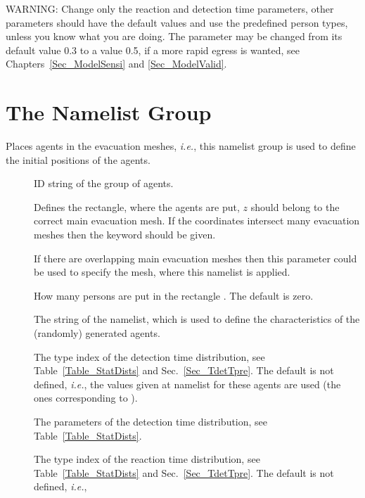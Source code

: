 \documentclass[12pt,a4paper,final,twoside]{stylevk}
\begin{document}
\noindent WARNING: Change only the reaction and detection time
parameters, other parameters should have the default values and use
the predefined person types, unless you know what you are doing.  The
parameter  may be changed from its default value 0.3
to a value 0.5, if a more rapid egress is wanted, see
Chapters~\ref{Sec_ModelSensi} and \ref{Sec_ModelValid}.

 
\section{The  Namelist Group}\label{Sec_EvacNML}

\noindent Places agents in the evacuation meshes, \emph{i.e.}, this
namelist group is used to define the initial positions of the agents.
%
\begin{description}
%
\item[] ID string of the group of agents.
%
\item[] Defines the rectangle, where the agents are put, $z$
  should belong to the correct main evacuation mesh.  If the
  coordinates  intersect many evacuation meshes then the
  keyword  should be given.
%
\item[] If there are overlapping main evacuation
  meshes then this parameter could be used to specify the mesh, where
  this  namelist is applied.
%
\item[] How many persons are put in
  the rectangle .  The default is zero.
%
\item[] The  string of the 
  namelist, which is used to define the characteristics of the
  (randomly) generated agents.
%
\item[] The type index of the detection time
  distribution, see Table~\ref{Table_StatDists} and
  Sec.~\ref{Sec_TdetTpre}.  The default is not defined, \emph{i.e.},
  the values given at  namelist for these agents are used
  (the ones corresponding to ).
%
\item[] The
  parameters of the detection time distribution, see
  Table~\ref{Table_StatDists}.
%
\item[] The type index of the reaction time
  distribution, see Table~\ref{Table_StatDists} and
  Sec.~\ref{Sec_TdetTpre}.  The default is not defined, \emph{i.e.},

\end{description}
\end{document}
